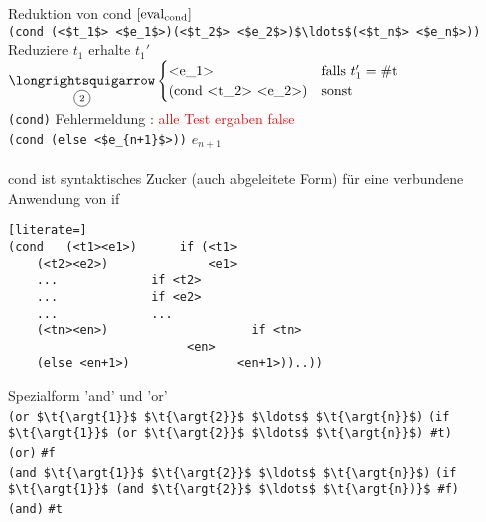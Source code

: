 \newpage
{}
Reduktion von cond $\lbrack \text{eval}_{\text{cond}}\rbrack $\\
\lstinline[mathescape]!(cond (<$t_1$> <$e_1$>)(<$t_2$> <$e_2$>)$\ldots$(<$t_n$> <$e_n$>))!\\
 Reduziere $t_1$ erhalte $t_1'$ $\underset{\t{\circled{2}}}{\t{\eval}} \begin{cases}
\t{\lstinline[mathescape]!<e_1>!} & \t{falls }t_1' = \t{\lstinline!#t!}\\
(\t{\lstinline[mathescape]!cond <t_2> <e_2>)!} & \t{sonst}
\end{cases}$\\
\lstinline[mathescape]!(cond)! \eval \glqq Fehlermeldung : \textcolor{red}{alle Test ergaben false} \grqq\\
\lstinline[mathescape]!(cond (else <$e_{n+1}$>))! \eval $e_{n+1}$\\
\bigskip\\
cond ist syntaktisches Zucker (auch abgeleitete Form) für eine verbundene Anwendung von if \\
\begin{lstlisting}[literate=]
(cond 	(<t1><e1>) 		if (<t1>
	(<t2><e2>)	    	    <e1>
	...				if <t2>
	...				if <e2>
	...				...
	(<tn><en>)       	    	  if <tn>
					     <en>
	(else <en+1>)  	 			<en+1>))..))
\end{lstlisting}
Spezialform 'and' und 'or' \\
\lstinline[mathescape]!(or $\t{\argt{1}}$ $\t{\argt{2}}$ $\ldots$ $\t{\argt{n}}$)! \eval \lstinline[mathescape]!(if $\t{\argt{1}}$ (or $\t{\argt{2}}$ $\ldots$ $\t{\argt{n}}$) #t)!\\
\lstinline[mathescape]!(or)! \eval \lstinline[mathescape]!#f! \\
\lstinline[mathescape]!(and $\t{\argt{1}}$ $\t{\argt{2}}$ $\ldots$ $\t{\argt{n}}$)! \eval \lstinline[mathescape]!(if $\t{\argt{1}}$ (and $\t{\argt{2}}$ $\ldots$ $\t{\argt{n})}$ #f)!\\
\lstinline[mathescape]!(and)! \eval \lstinline[mathescape]!#t!
\newpage
{}
